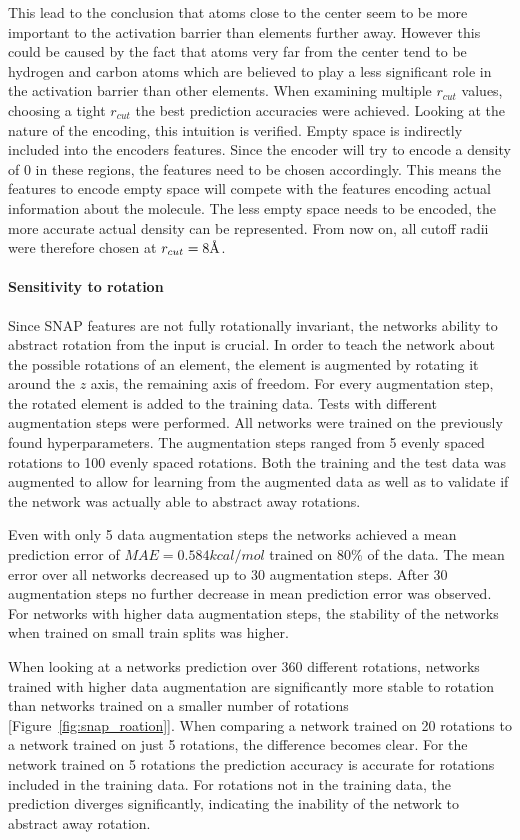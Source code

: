 This lead to the conclusion that atoms close to the center seem to be more important to the activation barrier than 
elements further away.
However this could be caused by the fact that atoms very far from the center tend to be hydrogen and carbon 
atoms which are believed to play a less significant role in the activation barrier than other elements.
When examining multiple $r_{cut}$ values, choosing a tight $r_{cut}$ the best prediction accuracies were achieved.
Looking at the nature of the encoding, this intuition is verified.
Empty space is indirectly included into the encoders features.
Since the encoder will try to encode a density of 0 in these regions,
the features need to be chosen accordingly.
This means the features to encode empty space will compete with the features encoding
actual information about the molecule.
The less empty space needs to be encoded, the more accurate actual density can be represented.
From now on, all cutoff radii were therefore chosen at $r_{cut} = 8 \AA$.


\paragraph{Sensitivity to rotation}
Since SNAP features are not fully rotationally invariant, the networks ability to abstract rotation from the input is crucial.
In order to teach the network about the possible rotations of an element, 
the element is augmented by rotating it around the $z$ axis, the remaining axis of freedom.
For every augmentation step, the rotated element is added to the training data.
Tests with different augmentation steps were performed.
All networks were trained on the previously found hyperparameters.
The augmentation steps ranged from 5 evenly spaced rotations to 100 evenly spaced rotations.
Both the training and the test data was augmented to allow for learning from the augmented data
as well as to validate if the network was actually able to abstract away rotations.

Even with only 5 data augmentation steps the networks achieved a mean prediction error of $MAE = 0.584 kcal/mol$ trained on 80\% of the data.
The mean error over all networks decreased up to 30 augmentation steps.
After 30 augmentation steps no further decrease in mean prediction error was observed.
For networks with higher data augmentation steps, the stability of the networks when trained on small train splits was higher.

When looking at a networks prediction over 360 different rotations, networks trained with higher data augmentation 
are significantly more stable to rotation than networks trained on a smaller number of rotations [Figure~\ref{fig:snap_roation}].
When comparing a network trained on 20 rotations to a network trained on just 5 rotations,
the difference becomes clear.
For the network trained on 5 rotations the prediction accuracy is accurate for rotations included in the training data.
For rotations not in the training data, the prediction diverges significantly, indicating the inability of the network to abstract away rotation.

